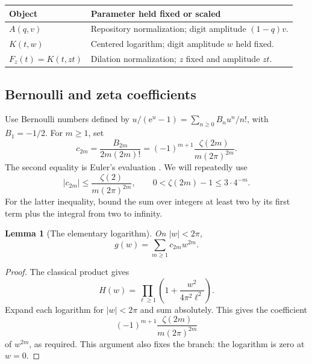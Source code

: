 \documentclass[11pt,a4paper]{article}
\numberwithin{equation}{section}
\newtheorem{lemma}[theorem]{Lemma}
\theoremstyle{definition}
\theoremstyle{remark}
\newcommand{\e}{\mathrm e}
\begin{document}
\begin{center}
\begin{tabularx}{\textwidth}{@{}lY@{}}
\toprule
Object & Parameter held fixed or scaled\\
\midrule
$A(q,v)$ & Repository normalization; digit amplitude $(1-q)v$.\\
$K(t,w)$ & Centered logarithm; digit amplitude $w$ held fixed.\\
$F_z(t)=K(t,zt)$ & Dilation normalization; $z$ fixed and amplitude $zt$.\\
\bottomrule
\end{tabularx}
\end{center}

\subsection{Bernoulli and zeta coefficients}
Use Bernoulli numbers defined by $u/(\e^u-1)=\sum_{n\ge0}B_nu^n/n!$, with $B_1=-1/2$. For $m\ge1$, set
\begin{equation}
 c_{2m}=\frac{B_{2m}}{2m(2m)!}
 =(-1)^{m+1}\frac{\zeta(2m)}{m(2\pi)^{2m}}.
 \label{eq:c}
\end{equation}
The second equality is Euler's evaluation \cite[\S25.6]{dlmf}. We will repeatedly use
\begin{equation}
 |c_{2m}|\le\frac{\zeta(2)}{m(2\pi)^{2m}},\qquad
 0<\zeta(2m)-1\le3\cdot4^{-m}.
 \label{eq:zetabounds}
\end{equation}
For the latter inequality, bound the sum over integers at least two by its first term plus the integral from two to infinity.

\begin{lemma}[The elementary logarithm]
On $|w|<2\pi$,
\begin{equation}
 g(w)=\sum_{m\ge1}c_{2m}w^{2m}.
 \label{eq:g}
\end{equation}
\end{lemma}
\begin{proof}
The classical product \cite[\S4.36]{dlmf} gives
\[
 H(w)=\prod_{\ell\ge1}\left(1+\frac{w^2}{4\pi^2\ell^2}\right).
\]
Expand each logarithm for $|w|<2\pi$ and sum absolutely. This gives the coefficient
\[(-1)^{m+1}\frac{\zeta(2m)}{m(2\pi)^{2m}}\]
of $w^{2m}$, as required. This argument also fixes the branch: the logarithm is zero at $w=0$.
\end{proof}
\end{document}
